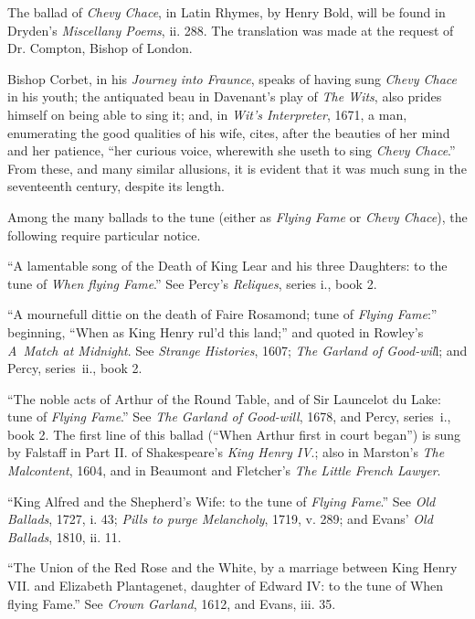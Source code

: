 The ballad of \textit{Chevy Chace}, in Latin Rhymes, by Henry Bold, will be found in
Dryden’s \textit{Miscellany Poems}, ii. 288. The translation was made at the request of
Dr. Compton, Bishop of London.

Bishop Corbet, in his \textit{Journey into Fraunce}, speaks of having sung \textit{Chevy
Chace} in his youth; the antiquated beau in Davenant’s play of \textit{The Wits}, also
prides himself on being able to sing it; and, in \textit{Wit’s Interpreter}, 1671, a man,
enumerating the good qualities of his wife, cites, after the beauties of her mind
and her patience, “her curious voice, wherewith she useth to sing \textit{Chevy Chace}.”
From these, and many similar allusions, it is evident that it was much sung in
the seventeenth century, despite its length.

Among the many ballads to the tune (either as \textit{Flying Fame} or \textit{Chevy Chace}),
the following require particular notice.

\pagebreak

“A lamentable song of the Death of King Lear and his three Daughters: to
the tune of \textit{When flying Fame}.” See Percy’s \textit{Reliques}, series i., book 2.

“A mournefull dittie on the death of Faire Rosamond; tune of \textit{Flying Fame}:”
beginning, “When as King Henry rul’d this land;” and quoted in Rowley’s
\textit{A~Match at Midnight}. See \textit{Strange Histories}, 1607; \textit{The Garland of Good-wil}l;
and Percy, series~ii., book 2.

“The noble acts of Arthur of the Round Table, and of Sir Launcelot du Lake:
tune of \textit{Flying Fame}.” See \textit{The Garland of Good-will}, 1678, and Percy, series~i.,
book 2. The first line of this ballad (“When Arthur first in court began”) is
sung by Falstaff in Part II. of Shakespeare’s \textit{King Henry IV}.; also in Marston’s
\textit{The Malcontent}, 1604, and in Beaumont and Fletcher’s \textit{The Little French Lawyer}.

“King Alfred and the Shepherd’s Wife: to the tune of \textit{Flying Fame}.” See
\textit{Old Ballads}, 1727, i. 43; \textit{Pills to purge Melancholy}, 1719, v. 289; and Evans’
\textit{Old Ballads}, 1810, ii. 11.

“The Union of the Red Rose and the White, by a marriage between King
Henry VII. and Elizabeth Plantagenet, daughter of Edward IV: to the tune of
When flying Fame.” See \textit{Crown Garland}, 1612, and Evans, iii. 35.

